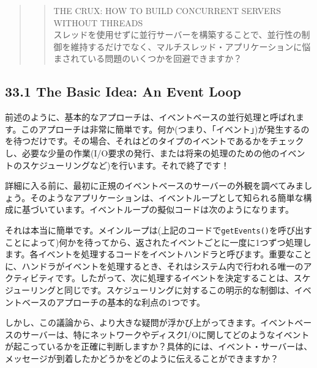 \begin{quote}
\begin{quote}
THE CRUX: HOW TO BUILD CONCURRENT SERVERS WITHOUT THREADS\\
スレッドを使用せずに並行サーバーを構築することで、並行性の制御を維持するだけでなく、マルチスレッド・アプリケーションに悩まされている問題のいくつかを回避できますか？
\end{quote}
\end{quote}

\hypertarget{the-basic-idea-an-event-loop}{%
\subsection*{33.1 The Basic Idea: An Event
Loop}\label{the-basic-idea-an-event-loop}}

前述のように、基本的なアプローチは、イベントベースの並行処理と呼ばれます。このアプローチは非常に簡単です。何か(つまり、「イベント」)が発生するのを待つだけです。その場合、それはどのタイプのイベントであるかをチェックし、必要な少量の作業(I/O要求の発行、または将来の処理のための他のイベントのスケジューリングなど)を行います。それで終了です！

詳細に入る前に、最初に正規のイベントベースのサーバーの外観を調べてみましょう。そのようなアプリケーションは、イベントループとして知られる簡単な構成に基づいています。イベントループの擬似コードは次のようになります。

\begin{Shaded}
\begin{Highlighting}[]
\NormalTok{ (}\NormalTok{) \{}
\NormalTok{\}}
\end{Highlighting}
\end{Shaded}

それは本当に簡単です。メインループは(上記のコードで\texttt{getEvents()}を呼び出すことによって)何かを待ってから、返されたイベントごとに一度に1つずつ処理します。各イベントを処理するコードをイベントハンドラと呼びます。重要なことに、ハンドラがイベントを処理するとき、それはシステム内で行われる唯一のアクティビティです。したがって、次に処理するイベントを決定することは、スケジューリングと同じです。スケジューリングに対するこの明示的な制御は、イベントベースのアプローチの基本的な利点の1つです。

しかし、この議論から、より大きな疑問が浮かび上がってきます。イベントベースのサーバーは、特にネットワークやディスクI/Oに関してどのようなイベントが起こっているかを正確に判断しますか？具体的には、イベント・サーバーは、メッセージが到着したかどうかをどのように伝えることができますか？

